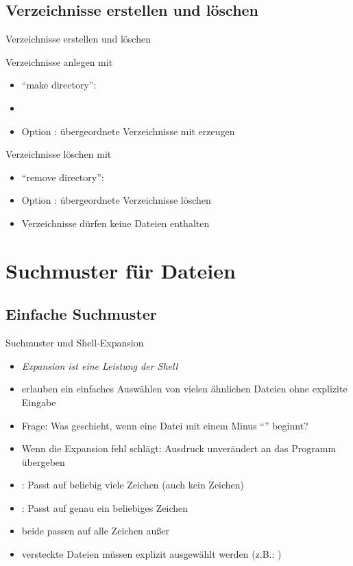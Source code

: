 \documentclass[aspectratio=43]{beamer}
\begin{document}
\subsection{Verzeichnisse erstellen und löschen}
\begin{frame}{Verzeichnisse erstellen und löschen}
  \begin{block}{Verzeichnisse anlegen mit }
    \begin{itemize}
      \item "`make directory"': 
      \item {}
      \item Option : übergeordnete Verzeichnisse mit erzeugen
    \end{itemize}
  \end{block}
  \begin{block}{Verzeichnisse löschen mit }
    \begin{itemize}
      \item "`remove directory"': 
      \item Option : übergeordnete Verzeichnisse löschen
      \item Verzeichnisse dürfen keine Dateien enthalten
    \end{itemize}
  \end{block}
\end{frame}

\section{Suchmuster für Dateien}
\subsection{Einfache Suchmuster}
\begin{frame}{Suchmuster und Shell-Expansion}
    \begin{itemize}
      \item \emph{Expansion ist eine Leistung der Shell}
      \item erlauben ein einfaches Auswählen von vielen ähnlichen Dateien ohne explizite Eingabe
      \item Frage: Was geschieht, wenn eine Datei mit einem Minus "`\co{-}"' beginnt?
      \item Wenn die Expansion fehl schlägt: Ausdruck unverändert an das Programm übergeben
      \item \co{*}: Passt auf beliebig viele Zeichen (auch kein Zeichen)
      \item {}: Passt auf genau ein beliebiges Zeichen
      \item beide passen auf alle Zeichen außer \co{/}
      \item versteckte Dateien müssen explizit ausgewählt werden (z.B.: )
    \end{itemize}
\end{frame}
\end{document}
